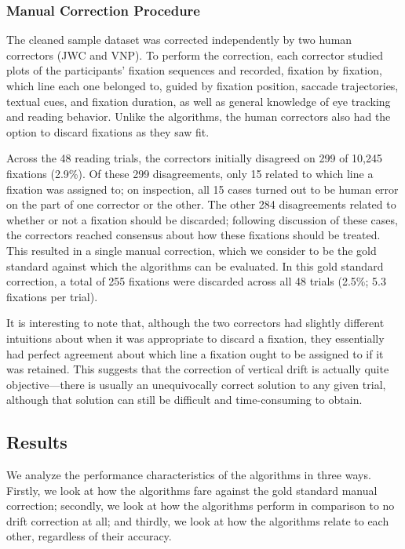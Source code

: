 \documentclass[doc,biblatex]{apa7}
\begin{document}
\subsubsection{Manual Correction Procedure}

The cleaned sample dataset was corrected independently by two human correctors (JWC and VNP). To perform the correction, each corrector studied plots of the participants' fixation sequences and recorded, fixation by fixation, which line each one belonged to, guided by fixation position, saccade trajectories, textual cues, and fixation duration, as well as general knowledge of eye tracking and reading behavior. Unlike the algorithms, the human correctors also had the option to discard fixations as they saw fit.

Across the 48 reading trials, the correctors initially disagreed on 299 of 10,245 fixations (2.9\%). Of these 299 disagreements, only 15 related to which line a fixation was assigned to; on inspection, all 15 cases turned out to be human error on the part of one corrector or the other. The other 284 disagreements related to whether or not a fixation should be discarded; following discussion of these cases, the correctors reached consensus about how these fixations should be treated. This resulted in a single manual correction, which we consider to be the gold standard against which the algorithms can be evaluated. In this gold standard correction, a total of 255 fixations were discarded across all 48 trials (2.5\%; 5.3 fixations per trial).

It is interesting to note that, although the two correctors had slightly different intuitions about when it was appropriate to discard a fixation, they essentially had perfect agreement about which line a fixation ought to be assigned to if it was retained. This suggests that the correction of vertical drift is actually quite objective---there is usually an unequivocally correct solution to any given trial, although that solution can still be difficult and time-consuming to obtain.

\subsection{Results}

We analyze the performance characteristics of the algorithms in three ways. Firstly, we look at how the algorithms fare against the gold standard manual correction; secondly, we look at how the algorithms perform in comparison to no drift correction at all; and thirdly, we look at how the algorithms relate to each other, regardless of their accuracy.
\end{document}
